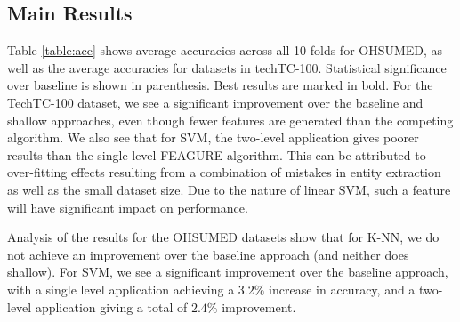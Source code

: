 \documentclass[twoside,11pt]{article}
\theoremstyle{definition}
\begin{document}







\subsection{Main Results}

Table \ref{table:acc} shows average accuracies across all 10 folds for OHSUMED, as well as the average accuracies for datasets in techTC-100. Statistical significance over baseline is shown in parenthesis. Best results are marked in bold.
For the TechTC-100 dataset, we see a significant improvement over the baseline and shallow approaches, even though fewer features are generated than the competing algorithm. We also see that for SVM, the two-level application gives poorer results than the single level FEAGURE algorithm. This can be attributed to over-fitting effects resulting from a combination of mistakes in entity extraction as well as the small dataset size. Due to the nature of linear SVM, such a feature will have significant impact on performance.

Analysis of the results for the OHSUMED datasets show that for K-NN, we do not achieve an improvement over the baseline approach (and neither does shallow). For SVM, we see a significant improvement over the baseline approach, with a single level application achieving a $3.2\%$ increase in accuracy, and a two-level application giving a total of $2.4\%$ improvement.
\end{document}
